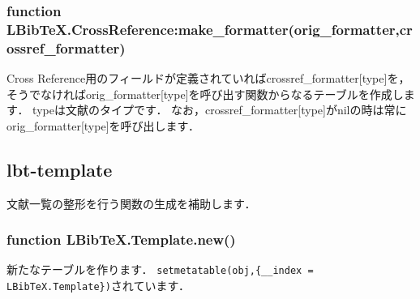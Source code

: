 \documentclass[dvipdfmx,a4paper]{jsarticle}
\begin{document}
\subsubsection{function LBibTeX.CrossReference:make\_formatter(orig\_formatter,crossref\_formatter)}
Cross Reference用のフィールドが定義されていればcrossref\_formatter[type]を，そうでなければorig\_formatter[type]を呼び出す関数からなるテーブルを作成します．
typeは文献のタイプです．
なお，crossref\_formatter[type]がnilの時は常にorig\_formatter[type]を呼び出します．

\subsection{lbt-template}
文献一覧の整形を行う関数の生成を補助します．

\subsubsection{function LBibTeX.Template.new()}
新たなテーブルを作ります．
\verb|setmetatable(obj,{__index = LBibTeX.Template})|されています．
\end{document}
